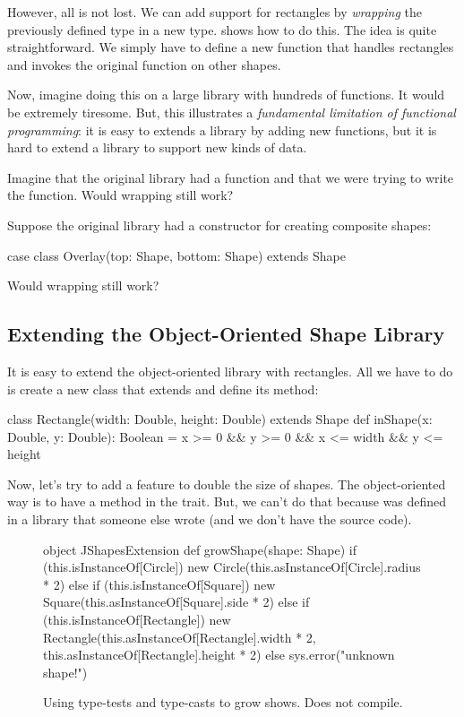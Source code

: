 \documentclass[9pt]{extbook}
\begin{document}
However, all is not lost. We can add support for rectangles by \emph{wrapping}
the previously defined  type in a new type. 
shows how to do this. The idea is quite straightforward. We simply
have to define a new  function that handles rectangles
and invokes the original  function on other shapes.

Now, imagine doing this on a large library with hundreds of functions. It would
be extremely tiresome. But, this illustrates a \emph{fundamental limitation of
functional programming}: it is easy to extends a library by adding new
functions, but it is hard to extend a library to support new kinds of data.

\begin{think}
Imagine that the original library had a  function
and that we were trying to write the  function.
Would wrapping still work?

Suppose the original library had a constructor for creating composite
shapes:
\begin{scalacode}
case class Overlay(top: Shape, bottom: Shape) extends Shape
\end{scalacode}
Would wrapping still work?
\end{think}

\subsection{Extending the Object-Oriented Shape Library}

It is easy to extend the object-oriented library with rectangles. All we
have to do is create a new class that extends 
and define its  method:
%
\begin{scalacode}
class Rectangle(width: Double, height: Double) extends Shape {
  def inShape(x: Double, y: Double): Boolean = x >= 0 && y >= 0 && x <= width && y <= height
}
\end{scalacode}

Now, let's try to add a feature to double the size of shapes. The object-oriented
way is to have a  method in the 
trait. But, we can't do that because  was defined in
a library that someone else wrote (and we don't have the source code).

\begin{figure}
\begin{scalacode}
object JShapesExtension {
  def growShape(shape: Shape) {
    if (this.isInstanceOf[Circle]) {
      new Circle(this.asInstanceOf[Circle].radius * 2)
    }
    else if (this.isInstanceOf[Square]) {
      new Square(this.asInstanceOf[Square].side * 2)
    }
    else if (this.isInstanceOf[Rectangle]) {
      new Rectangle(this.asInstanceOf[Rectangle].width * 2, this.asInstanceOf[Rectangle].height * 2)
    }
    else {
      sys.error("unknown shape!")
    }
  }
}
\end{scalacode}
\caption{Using type-tests and type-casts to grow shows. Does not compile.}
\label{jshapesext1}
\end{figure}
\end{document}
